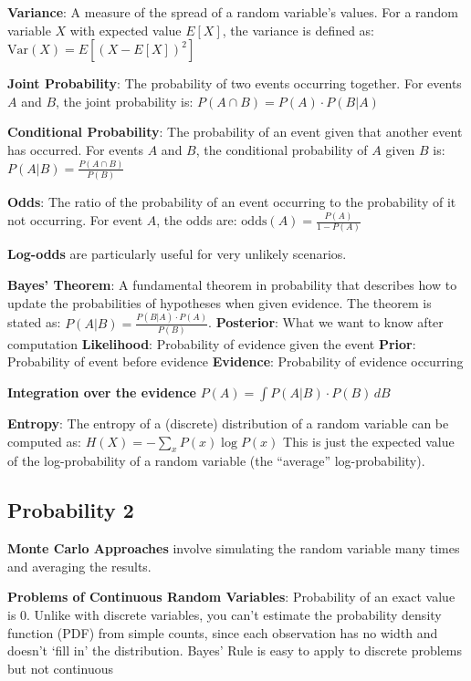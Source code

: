 \documentclass{article}
\begin{document}
\textbf{Variance}: A measure of the spread of a random variable's values. For a random variable $X$ with expected value $E[X]$, the variance is defined as:
$ \text{Var}(X) = E[(X - E[X])^2] $


\textbf{Joint Probability}: The probability of two events occurring together. For events $A$ and $B$, the joint probability is:
$ P(A \cap B) = P(A) \cdot P(B|A) $

\textbf{Conditional Probability}: The probability of an event given that another event has occurred. For events $A$ and $B$, the conditional probability of $A$ given $B$ is:
$ P(A|B) = \frac{P(A \cap B)}{P(B)} $

\textbf{Odds}: The ratio of the probability of an event occurring to the probability of it not occurring. For event $A$, the odds are:
$ \text{odds}(A) = \frac{P(A)}{1 - P(A)} $

\textbf{Log-odds} are particularly useful for very unlikely scenarios.

\textbf{Bayes' Theorem}: A fundamental theorem in probability that describes how to update the probabilities of hypotheses when given evidence. The theorem is stated as:
$ P(A|B) = \frac{P(B|A) \cdot P(A)}{P(B)} $.
\textbf{Posterior}: What we want to know after computation
\textbf{Likelihood}: Probability of evidence given the event
\textbf{Prior}: Probability of event before evidence
\textbf{Evidence}: Probability of evidence occurring

\textbf{Integration over the evidence}
$ P(A) = \int P(A|B) \cdot P(B) \, dB $

\textbf{Entropy}:
The entropy of a (discrete) distribution of a random variable can be
computed as:
$ H(X) = - \sum_{x} P(x) \log P(x) $
This is just the expected value of the log-probability of a random variable
(the “average” log-probability).


\subsection*{Probability 2}


\textbf{Monte Carlo Approaches} involve simulating the random variable many times and averaging the results.


\textbf{Problems of Continuous Random Variables}:
Probability of an exact value is 0.
Unlike with discrete variables, you can't estimate the probability density function (PDF) from simple counts,
since each observation has no width and doesn't `fill in' the distribution.
Bayes' Rule is easy to apply to discrete problems but not continuous
\end{document}
